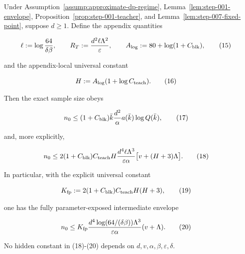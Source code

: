 \begin{lemma}\label{lem:step-007-sample-envelope}
Under Assumption~\ref{assump:approximate-dp-regime}, Lemma~\ref{lem:step-001-envelope}, Proposition~\ref{prop:step-001-teacher}, and
Lemma~\ref{lem:step-007-fixed-point}, suppose \(d\ge1\). Define the 
appendix quantities

\[
 \ell:=\log\frac{64}{\delta\beta},
 \qquad
 R_T:=\frac{d^2\ell\Lambda^2}{\varepsilon},
 \qquad
 A_{\log}:=80+\log(1+C_{\rm blk}),
\tag{15}
\]

and the appendix-local universal constant

\[
 H:=A_{\log}(1+\log C_{\rm teach}).
\tag{16}
\]

Then the exact sample size obeys

\[
 n_0
 \le(1+C_{\rm blk})\bar k\frac{d^2}{\alpha}
 a(\bar k)\log Q(\bar k),
\tag{17}
\]

and, more explicitly,

\[
 n_0
 \le
 2(1+C_{\rm blk})C_{\rm teach}H
 \frac{d^4\ell\Lambda^3}{\varepsilon\alpha}
 \bigl[v+(H+3)\Lambda\bigr].
\tag{18}
\]

In particular, with the explicit universal constant

\[
 K_{\rm fp}:=
 2(1+C_{\rm blk})C_{\rm teach}H(H+3),
\tag{19}
\]

one has the fully parameter-exposed intermediate envelope

\[
 n_0\le
 K_{\rm fp}
 \frac{d^4\log(64/(\delta\beta))\Lambda^3}
      {\varepsilon\alpha}
 (v+\Lambda).
\tag{20}
\]

No hidden constant in (18)-(20) depends on
\(d,v,\alpha,\beta,\varepsilon,\delta\).


\end{lemma}

